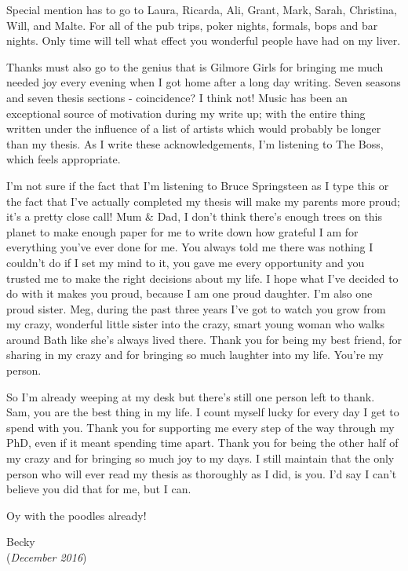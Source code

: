 \documentclass[12pt,useAMS]{ociamthesis}  %
\begin{document}
\begin{acknowledgements}
Special mention has to go to Laura, Ricarda, Ali, Grant, Mark, Sarah, Christina, Will, and Malte. For all of the pub trips, poker nights, formals, bops and bar nights. Only time will tell what effect you wonderful people have had on my liver.

Thanks must also go to the genius that is Gilmore Girls for bringing me much needed joy every evening when I got home after a long day writing. Seven seasons and seven thesis sections - coincidence? I think not! Music has been an exceptional source of motivation during my write up; with the entire thing written under the influence of a list of artists which would probably be longer than my thesis. As I write these acknowledgements, I'm listening to The Boss, which feels appropriate. 

I'm not sure if the fact that I'm listening to Bruce Springsteen as I type this or the fact that I've actually completed my thesis will make my parents more proud; it's a pretty close call! Mum \& Dad, I don't think there's enough trees on this planet to make enough paper for me to write down how grateful I am for everything you've ever done for me. You always told me there was nothing I couldn't do if I set my mind to it, you gave me every opportunity and you trusted me to make the right decisions about my life. I hope what I've decided to do with it makes you proud, because I am one proud daughter. I'm also one proud sister. Meg, during the past three years I've got to watch you grow from my crazy, wonderful little sister into the crazy, smart young woman who walks around Bath like she's always lived there. Thank you for being my best friend, for sharing in my crazy and for bringing so much laughter into my life. You're my person.

So I'm already weeping at my desk but there's still one person left to thank. Sam, you are the best thing in my life. I count myself lucky for every day I get to spend with you. Thank you for supporting me every step of the way through my PhD, even if it meant spending time apart. Thank you for being the other half of my crazy and for bringing so much joy to my days. I still maintain that the only person who will ever read my thesis as thoroughly as I did, is you. I'd say I can't believe you did that for me, but I can. 

Oy with the poodles already!


\begin{flushright}
Becky 
\\
(\emph{December 2016})
\end{flushright}

\end{acknowledgements}
\end{document}
